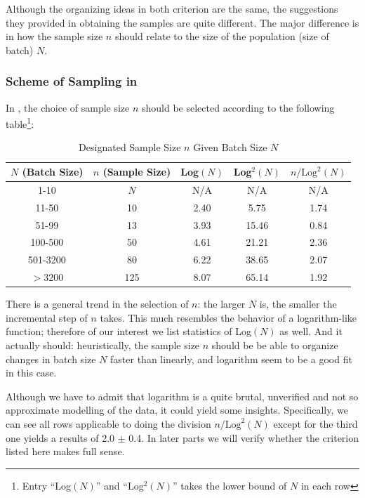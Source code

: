 \documentclass[12pt]{article}
\begin{document}
Although the organizing ideas in both criterion are the same, the suggestions they provided in obtaining the samples are quite different. The major difference is in how the sample size $n$ should relate to the size of the population (size of batch) $N$. 

\subsubsection{Scheme of Sampling in \cite{JJF2005}}

In \cite{JJF2005}, the choice of sample size $n$ should be selected according to the following table\footnote{Entry ``Log$(N)$'' and ``Log$^2(N)$'' takes the lower bound of $N$ in each row}:

\begin{table}[htbp]
    \centering
    \begin{tabular}{ccccc}
        \toprule
        $N$ (Batch Size) & $n$ (Sample Size) & Log$(N)$ & Log$^2(N)$ & $n/\text{Log}^2(N)$ \\
        \midrule
        1-10 & $N$ & N/A & N/A & N/A \\
        11-50 & 10 & 2.40 & 5.75 & 1.74 \\
        51-99 & 13 & 3.93 & 15.46 & 0.84 \\
        100-500 & 50 & 4.61 & 21.21 & 2.36 \\ 
        501-3200 & 80 & 6.22 & 38.65 & 2.07 \\
        $>$3200 & 125 & 8.07 & 65.14 & 1.92 \\
        \bottomrule
    \end{tabular}
    \caption{Designated Sample Size $n$ Given Batch Size $N$}
\end{table}

There is a general trend in the selection of $n$: the larger $N$ is, the smaller the incremental step of $n$ takes. This much resembles the behavior of a logarithm-like function; therefore of our interest we list statistics of Log$(N)$ as well. And it actually should: heuristically, the sample size $n$ should be be able to organize changes in batch size $N$ faster than linearly, and logarithm seem to be a good fit in this case. 

Although we have to admit that logarithm is a quite brutal, unverified and not so approximate modelling of the data, it could yield some insights. Specifically, we can see all rows applicable to doing the division $n/\text{Log}^2(N)$ except for the third one yields a results of 2.0 $\pm$ 0.4. In later parts we will verify whether the criterion listed here makes full sense. 
\end{document}
